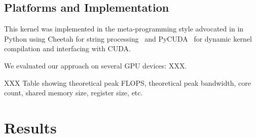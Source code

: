 \documentclass{sig-alternate}
\begin{document}
\subsection{Platforms and Implementation}

This kernel was implemented in the meta-programming style advocated
in \citet{pinto+cox:2011gcg} in Python using
Cheetah for string processing~\citep{cheetah}
and PyCUDA~\citep{klochner+etal:2009} for dynamic kernel
compilation and interfacing with CUDA.

We evaluated our approach on several GPU devices:
XXX.

XXX Table showing theoretical peak FLOPS, theoretical peak bandwidth, core count, shared memory size, register size, etc.


\section{Results}
\end{document}

